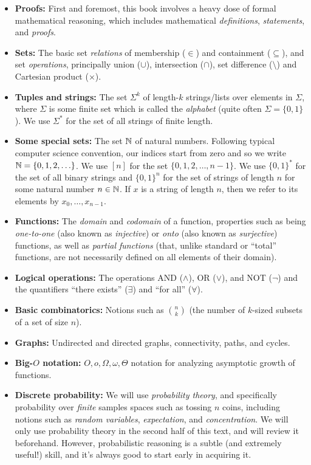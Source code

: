 \begin{itemize}
\item
  \textbf{Proofs:} First and foremost, this book involves a heavy dose
  of formal mathematical reasoning, which includes mathematical
  \emph{definitions}, \emph{statements}, and \emph{proofs}.
\item
  \textbf{Sets:} The basic set \emph{relations} of membership (\(\in\))
  and containment (\(\subseteq\)), and set \emph{operations},
  principally union (\(\cup\)), intersection (\(\cap\)), set difference
  (\(\setminus\)) and Cartesian product (\(\times\)).
\item
  \textbf{Tuples and strings:} The set \(\Sigma^k\) of length-\(k\)
  strings/lists over elements in \(\Sigma\), where \(\Sigma\) is some
  finite set which is called the \emph{alphabet} (quite often
  \(\Sigma = \{0,1\}\)). We use \(\Sigma^*\) for the set of all strings
  of finite length.
\item
  \textbf{Some special sets:} The set \({\mathbb{N}}\) of natural numbers.
  Following typical computer science convention, our indices start from
  zero and so we write \({\mathbb{N}} = \{0,1,2,\ldots \}\). We use \([n]\) for
  the set \(\{0,1,2,\ldots,n-1\}\). We use \(\{0,1\}^*\) for the set of
  all binary strings and \(\{0,1\}^n\) for the set of strings of length
  \(n\) for some natural number \(n\in{\mathbb{N}}\). If \(x\) is a string of
  length \(n\), then we refer to its elements by \(x_0,\ldots,x_{n-1}\).
\item
  \textbf{Functions:} The \emph{domain} and \emph{codomain} of a
  function, properties such as being \emph{one-to-one} (also known as
  \emph{injective}) or \emph{onto} (also known as \emph{surjective})
  functions, as well as \emph{partial functions} (that, unlike standard
  or ``total'' functions, are not necessarily defined on all elements of
  their domain).
\item
  \textbf{Logical operations:} The operations AND (\(\wedge\)), OR
  (\(\vee\)), and NOT (\(\neg\)) and the quantifiers ``there exists''
  (\(\exists\)) and ``for all'' (\(\forall\)).
\item
  \textbf{Basic combinatorics:} Notions such as \(\binom{n}{k}\) (the
  number of \(k\)-sized subsets of a set of size \(n\)).
\item
  \textbf{Graphs:} Undirected and directed graphs, connectivity, paths,
  and cycles.
\item
  \textbf{Big-\(O\) notation:} \(O,o,\Omega,\omega,\Theta\) notation for
  analyzing asymptotic growth of functions.
\item
  \textbf{Discrete probability:} We will use \emph{probability theory},
  and specifically probability over \emph{finite} samples spaces such as
  tossing \(n\) coins, including notions such as \emph{random
  variables}, \emph{expectation}, and \emph{concentration}. We will only
  use probability theory in the second half of this text, and will
  review it beforehand. However, probabilistic reasoning is a subtle
  (and extremely useful!) skill, and it's always good to start early in
  acquiring it.
\end{itemize}

